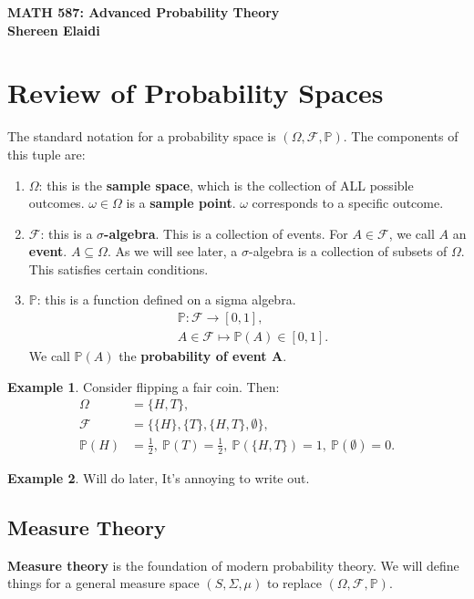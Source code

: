 \documentclass[11pt]{article}
\theoremstyle{definition}
\newtheorem{ex}{Example}[section]
\theoremstyle{theorem}
\newcommand{\prob}[1]{\mathbb{P}(#1)}
\begin{document}
\begin{center}
	\textbf{MATH 587: Advanced Probability Theory} \\
	\textbf{Shereen Elaidi}
\end{center}

\section{Review of Probability Spaces}
The standard notation for a probability space is \( ( \Omega, \mathcal{F}, \mathbb{P} ) \). The components of this tuple are: 
\begin{enumerate}[noitemsep]
	\item \( \Omega \): this is the \textbf{sample space}, which is the collection of ALL possible outcomes. \( \omega \in \Omega \) is a \textbf{sample point}. \( \omega \) corresponds to a specific outcome.
	\item \( \mathcal{F} \): this is a \textbf{ \( \sigma \)-algebra}. This is a collection of events. For \( A \in \mathcal{F} \), we call \( A \) an \textbf{event}. \( A \subseteq \Omega \). As we will see later, a \( \sigma \)-algebra is a collection of subsets of \( \Omega \). This satisfies certain conditions. 
	\item \( \mathbb{P} \): this is a function defined on a sigma algebra. 
	\begin{align*}
		& \mathbb{P}: \mathcal{F} \rightarrow [0,1],\\
		& A \in \mathcal{F} \mapsto \mathbb{P}(A) \in [0,1].
	\end{align*}
	We call \( \prob{A} \) the \textbf{probability of event A}.
\end{enumerate}

\begin{ex}
	Consider flipping a fair coin. Then: 
	\begin{align*} 
		\Omega & = \{ H, T \},  \\
		\mathcal{F} & = \{ \{ H \}, \{ T \}, \{ H, T \}, \emptyset \}, \\
		\prob{H} & = \frac{1}{2},\ \prob{T} = \frac{1}{2},\ \prob{ \{H, T \}} = 1,\ \prob{ \emptyset } = 0.
	\end{align*} 
\end{ex}

\begin{ex}
	Will do later, It's annoying to write out. 
\end{ex}

\subsection{Measure Theory}
\textbf{Measure theory} is the foundation of modern probability theory. We will define things for a general measure space \( (S, \Sigma, \mu ) \) to replace \( ( \Omega, \mathcal{F}, \mathbb{P} ) \). 
\end{document}
